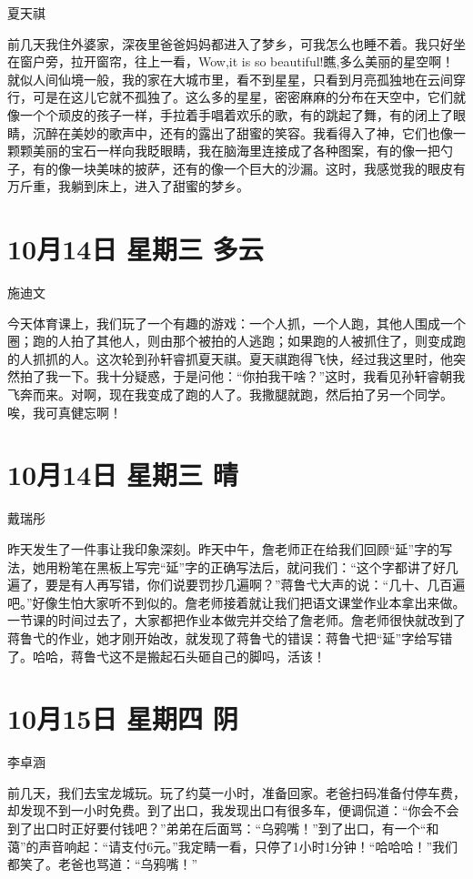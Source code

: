 夏天祺

前几天我住外婆家，深夜里爸爸妈妈都进入了梦乡，可我怎么也睡不着。我只好坐在窗户旁，拉开窗帘，往上一看，Wow,it
is so
beautiful!瞧,多么美丽的星空啊！就似人间仙境一般，我的家在大城市里，看不到星星，只看到月亮孤独地在云间穿行，可是在这儿它就不孤独了。这么多的星星，密密麻麻的分布在天空中，它们就像一个个顽皮的孩子一样，手拉着手唱着欢乐的歌，有的跳起了舞，有的闭上了眼睛，沉醉在美妙的歌声中，还有的露出了甜蜜的笑容。我看得入了神，它们也像一颗颗美丽的宝石一样向我眨眼睛，我在脑海里连接成了各种图案，有的像一把勺子，有的像一块美味的披萨，还有的像一个巨大的沙漏。这时，我感觉我的眼皮有万斤重，我躺到床上，进入了甜蜜的梦乡。

\section{10月14日 星期三 多云}

施迪文

今天体育课上，我们玩了一个有趣的游戏：一个人抓，一个人跑，其他人围成一个圈；跑的人拍了其他人，则由那个被拍的人逃跑；如果跑的人被抓住了，则变成跑的人抓抓的人。这次轮到孙轩睿抓夏天祺。夏天祺跑得飞快，经过我这里时，他突然拍了我一下。我十分疑惑，于是问他：``你拍我干啥？''这时，我看见孙轩睿朝我飞奔而来。对啊，现在我变成了跑的人了。我撒腿就跑，然后拍了另一个同学。唉，我可真健忘啊！

\section{10月14日 星期三 晴}

戴瑞彤

昨天发生了一件事让我印象深刻。昨天中午，詹老师正在给我们回顾``延''字的写法，她用粉笔在黑板上写完``延''字的正确写法后，就问我们：``这个字都讲了好几遍了，要是有人再写错，你们说要罚抄几遍啊？''蒋鲁弋大声的说：``几十、几百遍吧。''好像生怕大家听不到似的。詹老师接着就让我们把语文课堂作业本拿出来做。一节课的时间过去了，大家都把作业本做完并交给了詹老师。詹老师很快就改到了蒋鲁弋的作业，她才刚开始改，就发现了蒋鲁弋的错误：蒋鲁弋把``延''字给写错了。哈哈，蒋鲁弋这不是搬起石头砸自己的脚吗，活该！

\section{10月15日 星期四 阴}

李卓涵

前几天，我们去宝龙城玩。玩了约莫一小时，准备回家。老爸扫码准备付停车费，却发现不到一小时免费。到了出口，我发现出口有很多车，便调侃道：``你会不会到了出口时正好要付钱吧？''弟弟在后面骂：``乌鸦嘴！''到了出口，有一个``和蔼''的声音响起：``请支付6元。''我定睛一看，只停了1小时1分钟！``哈哈哈！''我们都笑了。老爸也骂道：``乌鸦嘴！''

